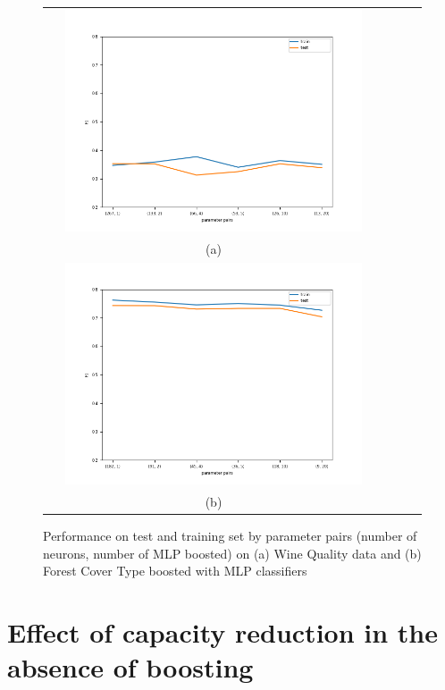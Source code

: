 \documentclass{article}
\begin{document}
\begin{figure} [H]
    \centering
    \begin{tabular}{cccc}
    \includegraphics[width=0.9\textwidth]{Results_MLP/mlp-wine-boosted_f1.png}\\
    (a) \\[6pt]
    \includegraphics[width=0.9\textwidth]{Results_MLP/mlp-covtype_balanced-boosted_f1.png}\\ (b)  \\[6pt]
    \end{tabular}
    \caption{Performance on test and training set by parameter pairs (number of neurons, number of MLP boosted) on (a) Wine Quality data and (b) Forest Cover Type boosted with MLP classifiers}
    \label{fig:Tree_results}
\end{figure}

\section{Effect of capacity reduction in the absence of boosting}
\label{Appendix_NoBoosting}
\end{document}
